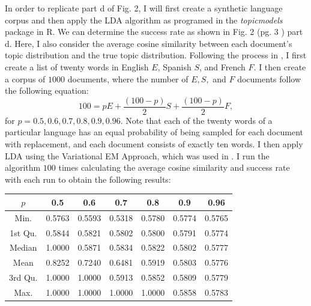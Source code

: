 \documentclass[12pt]{article}
\begin{document}
\noindent In order to replicate part d of Fig. 2, I will first create a synthetic language corpus and then apply the LDA algorithm as programed in the \textit{topicmodels} package in R. We can determine the success rate as shown in Fig. 2 (pg. 3 \cite{main}) part d. Here, I also consider the average cosine similarity between each document's topic distribution and the true topic distribution. Following the process in \cite{main}, I first create a list of twenty words in English $E$, Spanish $S$, and French $F$. I then create a corpus of $1000$ documents, where the number of $E, S,$ and $F$ documents follow the following equation:
$$
100=pE+\frac{(100-p)}{2}S+\frac{(100-p)}{2}F,
$$ 
for $p=0.5, 0.6, 0.7, 0.8, 0.9, 0.96$. Note that each of the twenty words of a particular language has an equal probability of being sampled for each document with replacement, and each document consists of exactly ten words. I then apply LDA using the Variational EM Approach, which was used in \cite{main}. I run the algorithm $100$ times calculating the average cosine similarity and success rate with each run to obtain the following results:   
	\vspace{2mm}
	\begin{center}
		\begin{tabular}{ ||c|c|c|c|c|c|c||  }
			\hline
	          $p$ &0.5&0.6&0.7&0.8&0.9&0.96 \\ 
	         \hline 
          Min.    &0.5763 &0.5593 &0.5318 &0.5780 &0.5774 &0.5765\\
          1st Qu. &0.5844 &0.5821 &0.5802 &0.5800 &0.5791 &0.5774\\
          Median  &1.0000 &0.5871 &0.5834 &0.5822 &0.5802 &0.5777\\
          Mean    &0.8252 &0.7240 &0.6481 &0.5919 &0.5803 &0.5776\\
          3rd Qu. &1.0000 &1.0000 &0.5913 &0.5852 &0.5809 &0.5779\\
          Max.    &1.0000 &1.0000 &1.0000 &1.0000 &0.5858 &0.5783\\
          \hline
          \end{tabular}
        \end{center}
        \vspace{2mm}
\end{document}
